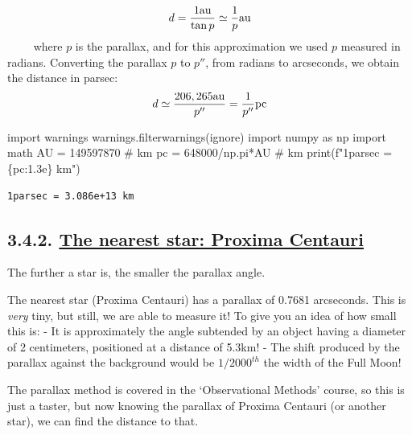 \documentclass[
  letterpaper,
  DIV=11,
  numbers=noendperiod]{scrreprt}
\newenvironment{Shaded}{\begin{snugshade}}{\end{snugshade}}
\newcommand{\BuiltInTok}[1]{\textcolor[rgb]{0.00,0.23,0.31}{#1}}
\newcommand{\CommentTok}[1]{\textcolor[rgb]{0.37,0.37,0.37}{#1}}
\newcommand{\DecValTok}[1]{\textcolor[rgb]{0.68,0.00,0.00}{#1}}
\newcommand{\ImportTok}[1]{\textcolor[rgb]{0.00,0.46,0.62}{#1}}
\newcommand{\NormalTok}[1]{\textcolor[rgb]{0.00,0.23,0.31}{#1}}
\newcommand{\OperatorTok}[1]{\textcolor[rgb]{0.37,0.37,0.37}{#1}}
\newcommand{\SpecialCharTok}[1]{\textcolor[rgb]{0.37,0.37,0.37}{#1}}
\newcommand{\SpecialStringTok}[1]{\textcolor[rgb]{0.13,0.47,0.30}{#1}}
\newcommand{\StringTok}[1]{\textcolor[rgb]{0.13,0.47,0.30}{#1}}
\begin{document}
\[
    d =\dfrac{1 \rm{au}}{\tan p}\simeq \dfrac{1}{p} \rm{au} 
\] \(\qquad\) where \(p\) is the parallax, and for this approximation we
used \(p\) measured in radians. Converting the parallax \(p\) to
\(p''\), from radians to arcseconds, we obtain the distance in parsec:
\[
    d \simeq\dfrac{206,265 \rm{au}}{p''}= \dfrac{1}{p''} \rm{pc} 
\]

\begin{Shaded}
\begin{Highlighting}[]
\ImportTok{import}\NormalTok{ warnings}
\NormalTok{warnings.filterwarnings(}\StringTok{\textquotesingle{}ignore\textquotesingle{}}\NormalTok{)}
\ImportTok{import}\NormalTok{ numpy }\ImportTok{as}\NormalTok{ np}
\ImportTok{import}\NormalTok{ math}
\NormalTok{AU }\OperatorTok{=} \DecValTok{149597870} \CommentTok{\# km}
\NormalTok{pc }\OperatorTok{=} \DecValTok{648000}\OperatorTok{/}\NormalTok{np.pi}\OperatorTok{*}\NormalTok{AU }\CommentTok{\# km}
\BuiltInTok{print}\NormalTok{(}\SpecialStringTok{f"1parsec = }\SpecialCharTok{\{}\NormalTok{pc}\SpecialCharTok{:1.3e\}}\SpecialStringTok{ km"}\NormalTok{)}
\end{Highlighting}
\end{Shaded}

\begin{verbatim}
1parsec = 3.086e+13 km
\end{verbatim}

\hypertarget{the-nearest-star-proxima-centauri}{%
\subsection{\texorpdfstring{3.4.2. \protect\hyperlink{toc0_}{The nearest
star: Proxima
Centauri}}{3.4.2. The nearest star: Proxima Centauri}}\label{the-nearest-star-proxima-centauri}}

The further a star is, the smaller the parallax angle.

The nearest star (Proxima Centauri) has a parallax of 0.7681 arcseconds.
This is \emph{very} tiny, but still, we are able to measure it! To give
you an idea of how small this is: - It is approximately the angle
subtended by an object having a diameter of 2 centimeters, positioned at
a distance of 5.3km! - The shift produced by the parallax against the
background would be \(1/2000^{th}\) the width of the Full Moon!

The parallax method is covered in the `Observational Methods' course, so
this is just a taster, but now knowing the parallax of Proxima Centauri
(or another star), we can find the distance to that.
\end{document}
